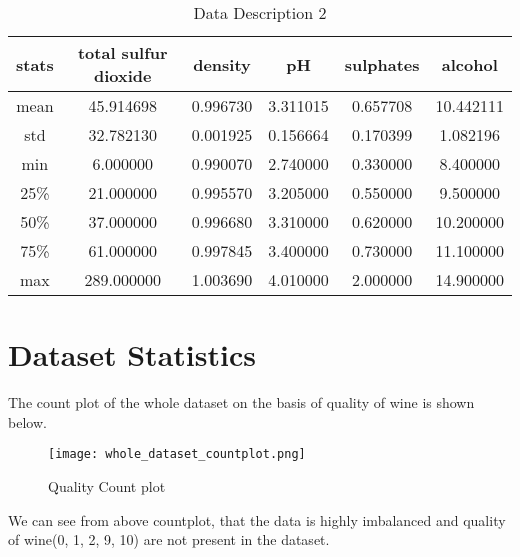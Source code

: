 \begin{table}[H]
    \begin{center}
        \begin{tabular}{ |c|c|c|c|c|c| }
            \hline
            stats      & 
            total sulfur dioxide	&density&	pH	&sulphates&	alcohol	  \\
            \hline
            mean & 45.914698	&0.996730&	3.311015	&0.657708	&10.442111 \\
            \hline

            std & 32.782130	&0.001925&	0.156664&	0.170399&	1.082196	\\
            \hline

            min & 6.000000	&0.990070	&2.740000&	0.330000	&8.400000	 \\
            \hline

            25\% & 21.000000	&0.995570&	3.205000	&0.550000&	9.500000	 \\
            \hline

            50\% & 37.000000	&0.996680&	3.310000	&0.620000&	10.200000		 \\
            \hline

            75\% & 61.000000&	0.997845&	3.400000&	0.730000&	11.100000		 \\
            \hline

            max & 289.000000 &	1.003690&	4.010000&	2.000000&	14.900000	 \\
            \hline
        \end{tabular}
    \end{center}
    \caption{Data Description 2}
    \label{table:Data Description 2}
\end{table}



\section{Dataset Statistics}
The count plot of the whole dataset on the basis of quality of wine is shown below.

\begin{figure}[H]
    \centering
    \texttt{[image: whole\_dataset\_countplot.png]}
    \caption{Quality Count plot}
    \label{fig:Quality Count plot}
\end{figure}

We can see from above countplot, that the data is highly imbalanced and quality of wine(0, 1, 2, 9, 10) are not present in the dataset.

